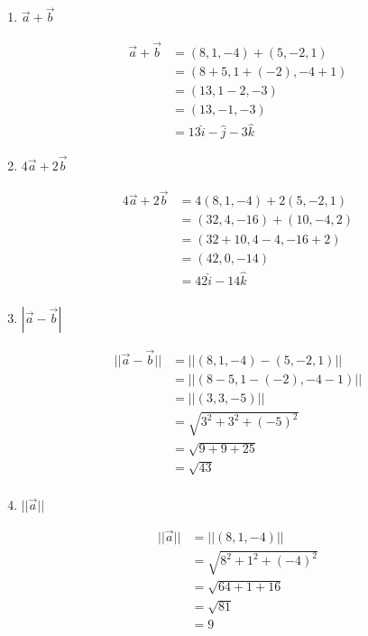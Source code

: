 \documentclass[12pt]{article}
\begin{document}
\begin{enumerate}[format=\textbf]
  
\item $\vec{a} + \vec{b}$
  
  \begin{equation*}
    \begin{split}
      \vec{a} + \vec{b} &= (8, 1, -4) + (5, -2, 1)\\
      &= (8+5,1+ (-2), -4+1) \\
      &=(13, 1-2, -3)\\
      &= (13, -1, -3) \\
      &= 13\hat{i} - \hat{j} -3\hat{k}
    \end{split}
  \end{equation*}
  
\item $4 \vec{a} + 2\vec{b}$
  
  \begin{equation*}
    \begin{split}
      4 \vec{a} + 2\vec{b} &= 4(8, 1, -4) + 2(5, -2, 1)\\
      &=  (32, 4, -16) + (10, -4, 2)\\
      &=  (32+10, 4-4, -16+2) \\
      &= (42, 0, -14)\\
      &= 42\hat{i}  - 14\hat{k} \\
    \end{split}
  \end{equation*}

\item $|\vec{a} - \vec{b}|$
  
  \begin{equation*}
    \begin{split}
      ||\vec{a} - \vec{b}|| &= ||(8, 1, -4) - (5, -2, 1)|| \\
      &= ||(8-5, 1-(-2), -4-1) || \\
      &= ||(3, 3, -5)|| \\
      &= \sqrt{3^2 + 3^2 + (-5)^2} \\
      &= \sqrt{9 + 9 + 25} \\
      &= \sqrt{43} \\
    \end{split}
  \end{equation*}

\item $||\vec{a}||$
  
  \begin{equation*}
    \begin{split}
      ||\vec{a}|| &= ||(8, 1, -4)|| \\
      &= \sqrt{8^2 + 1^2 + (-4)^2} \\
      &= \sqrt{64 + 1 + 16} \\
      &= \sqrt{81} \\
      &= 9
    \end{split}
  \end{equation*}
  
\end{enumerate}
\end{document}
